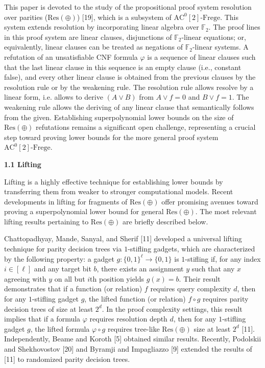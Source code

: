 \documentclass[10pt,a4paper]{article}
\begin{document}
This paper is devoted to the study of the propositional proof system resolution over parities ($\mathrm{Res}(\oplus)$) [19], which is a subsystem of $\mathrm{AC}^{0}[2]\text{-}\mathrm{Frege}$. This system extends resolution by incorporating linear algebra over $\mathbb{F}_{2}$. The proof lines in this proof system are linear clauses, disjunctions of $\mathbb{F}_{2}$-linear equations; or, equivalently, linear clauses can be treated as negations of $\mathbb{F}_{2}$-linear systems. A refutation of an unsatisfiable CNF formula $\varphi$ is a sequence of linear clauses such that the last linear clause in this sequence is an empty clause (i.e., constant false), and every other linear clause is obtained from the previous clauses by the resolution rule or by the weakening rule. The resolution rule allows resolve by a linear form, i.e. allows to derive $(A\lor B)$ from $A\lor f=0$ and $B\lor f=1$. The weakening rule allows the deriving of any linear clause that semantically follows from the given. Establishing superpolynomial lower bounds on the size of $\mathrm{Res}(\oplus)$ refutations remains a significant open challenge, representing a crucial step toward proving lower bounds for the more general proof system $\mathrm{AC}^{0}[2]\text{-}\mathrm{Frege}$.\par


\par\medskip\noindent\textbf{
1.1 Lifting}\par


Lifting is a highly effective technique for establishing lower bounds by transferring them from weaker to stronger computational models. Recent developments in lifting for fragments of $\mathrm{Res}(\oplus)$ offer promising avenues toward proving a superpolynomial lower bound for general $\mathrm{Res}(\oplus)$. The most relevant lifting results pertaining to $\mathrm{Res}(\oplus)$ are briefly described below.\par



Chattopadhyay, Mande, Sanyal, and Sherif [11] developed a universal lifting technique for parity decision trees
via $1$-stifling gadgets, which are characterized by the following property: a gadget $g\colon\{0,1\}^{\ell}\to\{0,1\}$ is $1$-stifling if, for any index $i\in[\ell]$ and any target bit $b$, there exists an assignment $y$ such that any $x$ agreeing with $y$ on all but $i$th position yields $g(x)=b$.
Their result demonstrates that if a function (or relation) $f$ requires query complexity $d$, then for any $1$-stifling gadget $g$, the lifted function (or relation) $f\circ g$ requires parity decision trees of size at least $2^{d}$. In the proof complexity settings, this result implies that if a
formula $\varphi$ requires resolution depth $d$, then for any $1$-stifling gadget $g$, the lifted formula $\varphi\circ g$ requires tree-like $\mathrm{Res}(\oplus)$ size at least $2^{d}$ [11]. Independently, Beame and Koroth [5] obtained similar results. Recently, Podolskii and Shekhovostov [20] and Byramji and Impagliazzo [9] extended the results of [11] to randomized parity decision trees.\par
\end{document}
